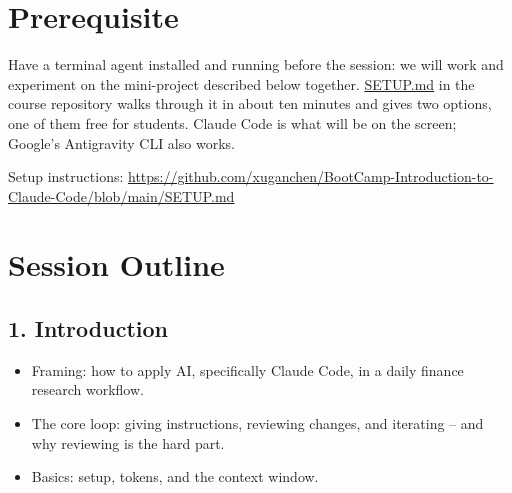 \documentclass[11pt]{article}
\begin{document}
\section*{Prerequisite}

Have a terminal agent installed and running before the session: we will work and experiment on the mini-project described below together. \href{https://github.com/xuganchen/BootCamp-Introduction-to-Claude-Code/blob/main/SETUP.md}{SETUP.md} in the course repository walks through it in about ten minutes and gives two options, one of them free for students. Claude Code is what will be on the screen; Google's Antigravity CLI also works. 

Setup instructions: \url{https://github.com/xuganchen/BootCamp-Introduction-to-Claude-Code/blob/main/SETUP.md}

\section*{Session Outline}

\subsection*{1. Introduction}
\begin{itemize}
  \item Framing: how to apply AI, specifically Claude Code, in a daily finance research workflow.
  \item The core loop: giving instructions, reviewing changes, and iterating -- and why reviewing is the hard part.
  \item Basics: setup, tokens, and the context window.
\end{itemize}
\end{document}
